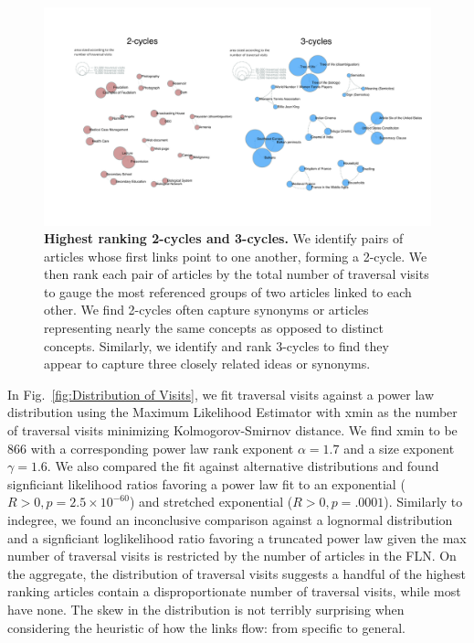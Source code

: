 \documentclass[pre,twocolumn,twoside,superscriptaddress,floatfix, aps, 10pt]{revtex4-1}
\begin{document}
\begin{figure}[tph!]
  \includegraphics[width=\textwidth]{graphics/2_and_3_cycles.pdf}
  \caption{
    \textbf{Highest ranking 2-cycles and 3-cycles.}
We identify pairs of articles whose first links point to one another, forming
a 2-cycle. We then rank each pair of articles by the total number of 
traversal visits to gauge the most referenced groups of two articles linked
to each other. We find 2-cycles often capture synonyms or articles representing nearly the 
same concepts as opposed to distinct concepts. Similarly, we identify and 
rank 3-cycles to find they appear to capture three closely related ideas or synonyms.}
  \label{fig:cycles}
\end{figure}
In Fig.~\ref{fig:Distribution of Visits}, we fit traversal visits against a power law distribution using the Maximum Likelihood Estimator with xmin as the number of traversal visits minimizing Kolmogorov-Smirnov distance. We find xmin to be 866 with a corresponding power law rank exponent $\alpha = 1.7$ and a size exponent $\gamma = 1.6$.
We also compared the fit against alternative distributions and found signficiant likelihood ratios favoring a power law fit to an exponential ($R>0, p=2.5\times10^{-60}$) and stretched exponential ($R > 0, p=.0001$).
Similarly to indegree, we found an inconclusive comparison against a lognormal distribution and a signficiant loglikelihood ratio favoring a truncated power law given the max number of traversal visits is restricted by the number of articles in the FLN. 
On the aggregate, the distribution of traversal visits suggests
a handful of the highest ranking articles contain a disproportionate number of traversal visits, while most have none. The skew in the distribution is not terribly surprising when considering the heuristic of how the links flow: from specific to general. 
\end{document}
